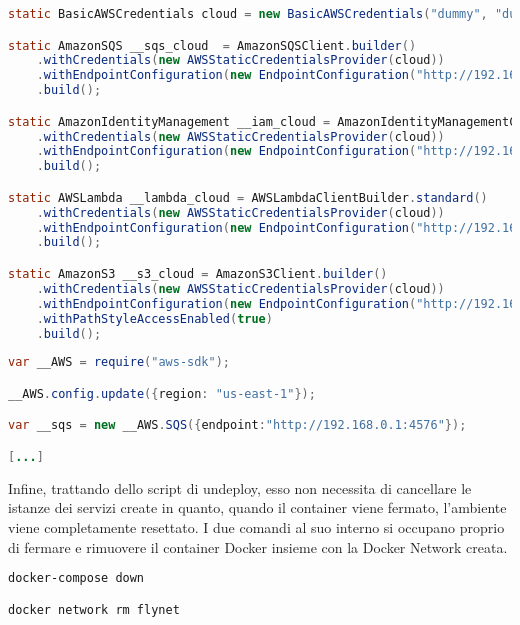 \begin{lstlisting}[language=Java,caption={Codice Java generato per l'ambiente aws-debug}, label={lst:debugJava}]
static BasicAWSCredentials cloud = new BasicAWSCredentials("dummy", "dummy");

static AmazonSQS __sqs_cloud  = AmazonSQSClient.builder()
    .withCredentials(new AWSStaticCredentialsProvider(cloud))
    .withEndpointConfiguration(new EndpointConfiguration("http://192.168.0.1:4576", "us-east-1"))
    .build();

static AmazonIdentityManagement __iam_cloud = AmazonIdentityManagementClientBuilder.standard()
    .withCredentials(new AWSStaticCredentialsProvider(cloud))
    .withEndpointConfiguration(new EndpointConfiguration("http://192.168.0.1:4593", "us-east-1"))
    .build();

static AWSLambda __lambda_cloud = AWSLambdaClientBuilder.standard()
    .withCredentials(new AWSStaticCredentialsProvider(cloud))
    .withEndpointConfiguration(new EndpointConfiguration("http://192.168.0.1:4574", "us-east-1"))
    .build();

static AmazonS3 __s3_cloud = AmazonS3Client.builder()
    .withCredentials(new AWSStaticCredentialsProvider(cloud))
    .withEndpointConfiguration(new EndpointConfiguration("http://192.168.0.1:4572", "us-east-1"))
    .withPathStyleAccessEnabled(true)
    .build();
\end{lstlisting}  

\begin{lstlisting}[language=Java,caption={Codice JavaScript generato per l'ambiente aws-debug}, label={lst:debugJavaScript}]
var __AWS = require("aws-sdk");

__AWS.config.update({region: "us-east-1"});

var __sqs = new __AWS.SQS({endpoint:"http://192.168.0.1:4576"});

[...]
\end{lstlisting} 

Infine, trattando dello script di undeploy, esso non necessita di cancellare le istanze dei servizi create in quanto, quando il container viene fermato, l'ambiente viene completamente resettato. I due comandi al suo interno si occupano proprio di fermare e rimuovere il container Docker insieme con la Docker Network creata.\\

\begin{lstlisting}[language=bash,caption={Script di undeploy per l'ambiente aws-debug.}, label={lst:debugUndeploy}]
docker-compose down

docker network rm flynet
\end{lstlisting}

